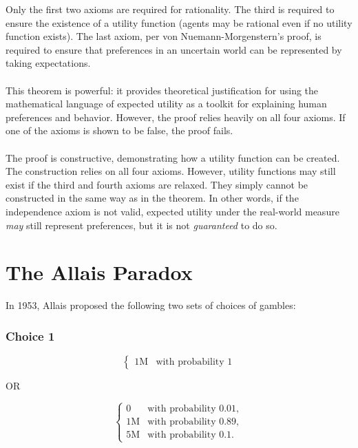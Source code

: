 \documentclass{article}
\begin{document}
Only the first two axioms are required for rationality.  The third is required to ensure the existence of a utility function (agents may be rational even if no utility function exists).  The last axiom, per von Nuemann-Morgenstern's proof, is required to ensure that preferences in an uncertain world can be represented by taking expectations. 
\\
\\
This theorem is powerful: it provides theoretical justification for using the mathematical language of expected utility as a toolkit for explaining human preferences and behavior.  However, the proof relies heavily on all four axioms.  If one of the axioms is shown to be false, the proof fails.  
\\
\\
The proof is constructive, demonstrating how a utility function can be created.  The construction relies on all four axioms.  However, utility functions may still exist if the third and fourth axioms are relaxed.  They simply cannot be constructed in the same way as in the theorem.  In other words, if the independence axiom is not valid, expected utility under the real-world measure \emph{may} still represent preferences, but it is not \emph{guaranteed} to do so.  

\section{The Allais Paradox} 

In 1953, Allais proposed the following two sets of choices of gambles:

\subsubsection{Choice 1}

\begin{equation*}
\left\{
\begin{array}{rl}
1\text{M} & \text{with probability } 1
\end{array} \right.
\end{equation*}

OR

\begin{equation*}
\left\{
\begin{array}{rl}
0 & \text{with probability } 0.01,
\\1\text{M} & \text{with probability } 0.89,
\\5\text{M} & \text{with probability } 0.1.
\end{array} \right.
\end{equation*}
\end{document}

